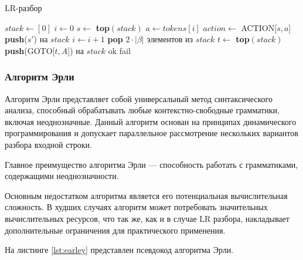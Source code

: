 \documentclass[14pt, russian]{scrartcl}
\begin{document}
\begin{listing}[H]
	\caption{LR-разбор}
	\label{lst:lr}
\begin{algorithm}[H]
	\begin{algorithmic}[1]
	  \State $stack \gets [0]$
	  \State $i \gets 0$
		\State $s \gets$ \textbf{top}$(stack)$
		\State $a \gets tokens[i]$
		\State $action \gets$ ACTION[$s, a$]
		  \State \textbf{push}($s'$) на $stack$
		  \State $i \gets i + 1$
		  \State \textbf{pop} $2\cdot |\beta|$ элементов из $stack$
		  \State $t \gets$ \textbf{top}$(stack)$
		  \State \textbf{push}(GOTO[$t, A$]) на $stack$
		  \State \Return ok
		\Else
		  \State \Return fail
		\EndIf
	  \EndWhile
	\EndProcedure
	\end{algorithmic}
	\end{algorithm}
\end{listing}

\subsubsection{Алгоритм Эрли}

\label{sec:earleyint}

Алгоритм Эрли представляет собой универсальный метод синтаксического анализа, способный обрабатывать любые
контекстно-свободные грамматики, включая неоднозначные. Данный алгоритм основан на принципах динамического
программирования и допускает параллельное рассмотрение нескольких вариантов разбора входной строки.

Главное преимущество алгоритма Эрли --- способность работать с грамматиками, содержащими неоднозначности.

Основным недостатком алгоритма является его потенциальная вычислительная сложность. В худших случаях алгоритм
может потребовать значительных вычислительных ресурсов, что так же, как и в случае LR разбора, накладывает
дополнительные ограничения для практического применения.


На листинге \ref{lst:earley} представлен псевдокод алгоритма Эрли.
\end{document}
